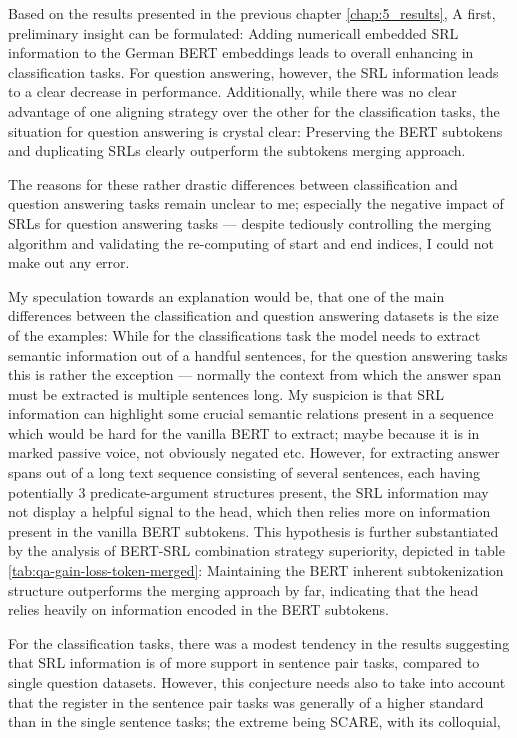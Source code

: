 \label{chap:5_discussion}


Based on the results presented in the previous chapter \ref{chap:5_results}, A first, preliminary
insight can be formulated: Adding numericall embedded SRL information to the German  BERT embeddings
leads to overall enhancing in classification tasks. For question answering, however, the SRL information
leads to a clear decrease in performance. Additionally, while there was no clear advantage of one aligning strategy
over the other for the classification tasks, the situation for question answering is crystal clear: Preserving
the BERT subtokens and duplicating SRLs clearly outperform the subtokens merging approach.

The reasons for these rather drastic differences between classification and question answering
tasks remain unclear to me; especially the negative impact of SRLs for question answering tasks
--- despite tediously controlling the merging algorithm and validating the re-computing of start
and end indices, I could not make out any error.

My speculation towards an explanation would be, that one of the main differences between
the classification and question answering datasets is the size of the examples: While for
the classifications task the model needs to extract semantic information out of a handful
sentences, for the question answering tasks this is rather the exception --- normally
the context from which the answer span must be extracted is multiple sentences long. My
suspicion is that SRL information can highlight some crucial semantic relations present in a
sequence which would be hard for the vanilla BERT to extract; maybe because it is in marked
passive voice, not obviously negated etc. However, for extracting answer spans out of a long
text sequence consisting of several sentences, each having potentially 3 predicate-argument
structures present, the SRL information may not display a helpful signal to the head, which
then relies more on information present in the vanilla BERT subtokens. This hypothesis is
further substantiated by the analysis of BERT-SRL combination strategy superiority, depicted
in table \ref{tab:qa-gain-loss-token-merged}: Maintaining the BERT inherent subtokenization
structure outperforms the merging approach by far, indicating that the head relies heavily
on information encoded in the BERT subtokens.

For the classification tasks, there was a modest tendency in the results suggesting that
SRL information is of more support in sentence pair tasks, compared to single question datasets.
However, this conjecture needs also to take into account that the register in the sentence
pair tasks was generally of a higher standard than in the single sentence tasks; the
extreme being SCARE, with its colloquial,

